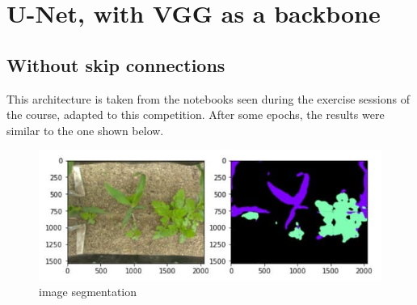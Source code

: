 \documentclass[12pt,a4paper]{report}
\begin{document}
		\section{U-Net, with VGG as a backbone}
	\subsection{Without skip connections}
This architecture is taken from the notebooks seen during the exercise sessions of the course, adapted to this competition.
After some epochs, the results were similar to the one shown below.

\begin{figure}[H]
	\includegraphics[scale = .75, center]{vgg_upsampling_without}
	\caption{image segmentation}
\end{figure}
\end{document}
